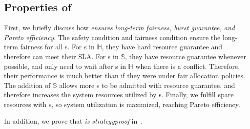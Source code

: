 


\vspace{-0.1in}
\subsection{Properties of \name}

First, we briefly discuss how \emph{\name ensures long-term fairness, burst guarantee, and Pareto efficiency}. 
The safety condition and fairness condition ensure the long-term fairness for all {\batchq}s. %
For {\burstq}s in $\mathbb{H}$, they have hard resource guarantee and therefore can meet their SLA. For {\burstq}s in $\mathbb{S}$, they have resource guarantee whenever possible, and only need to wait after {\burstq}s in $\mathbb{H}$ when there is a conflict. Therefore, their performance is much better than if they were under fair allocation policies. %
The addition of $\mathbb{S}$ allows more {\burstq}s to be admitted with resource guarantee, and therefore increases the system resources utilized by {\burstq}s. Finally, we fulfill spare resources with {\batchq}s, so system utilization is maximized, reaching Pareto efficiency.

In addition, we prove that \emph{\name is strategyproof} in~\cite{tech_report}.

